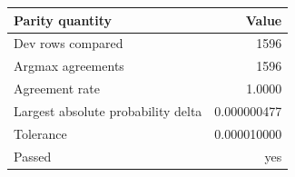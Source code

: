 \begingroup\small\setlength{\tabcolsep}{4pt}
\begin{tabular}{lr}
\toprule
\textbf{Parity quantity} & \textbf{Value} \\
\midrule
Dev rows compared & 1596 \\  %
Argmax agreements & 1596 \\  %
Agreement rate & 1.0000 \\  %
Largest absolute probability delta & 0.000000477 \\  %
Tolerance & 0.000010000 \\  %
Passed & yes \\
\bottomrule
\end{tabular}
\endgroup
\par\smallskip{}
